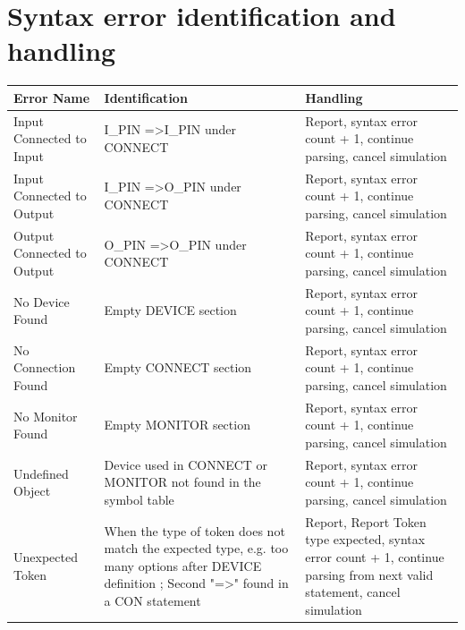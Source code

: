 \documentclass[12pt]{article}
\begin{document}
\section{Syntax error identification and handling}
\begin{center}
	\begin{tabular}{|m{3cm} | m{6cm} | m{8cm} |}
		\hline
		Error Name & Identification & Handling \\
		\hline
		Input Connected to Input & I\_PIN =\textgreater  I\_PIN under CONNECT &  Report, syntax error count + 1, continue parsing, cancel simulation \\
		\hline
		Input Connected to Output & I\_PIN =\textgreater  O\_PIN under CONNECT &  Report, syntax error count + 1, continue parsing, cancel simulation \\
		\hline
		Output Connected to Output & O\_PIN =\textgreater  O\_PIN under CONNECT &  Report, syntax error count + 1, continue parsing, cancel simulation \\
		\hline
		No Device Found & Empty DEVICE section & Report, syntax error count + 1, continue parsing, cancel simulation \\
		\hline
		No Connection Found & Empty CONNECT section & Report, syntax error count + 1, continue parsing, cancel simulation \\
		\hline
		No Monitor Found & Empty MONITOR section & Report, syntax error count + 1, continue parsing, cancel simulation \\
		\hline
		Undefined Object & Device used in CONNECT or MONITOR not found in the symbol table & Report, syntax error count + 1, continue parsing, cancel simulation \\
		\hline
		Unexpected Token & When the type of token does not match the expected type, e.g. too many options after DEVICE definition ; Second "=\textgreater" found in a CON statement & Report, Report Token type expected,  syntax error count + 1, continue parsing from next valid statement, cancel simulation \\
		\hline
	
	\end{tabular}
\end{center}
\newpage
\end{document}
